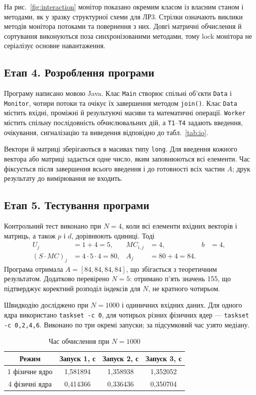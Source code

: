 \documentclass[12pt,a4paper]{article}
\begin{document}
На рис.~\ref{fig:interaction} монітор показано окремим класом із власним
станом і методами, як у зразку структурної схеми для ЛР3. Стрілки
означають виклики методів монітора потоками та повернення з них. Довгі
матричні обчислення й сортування виконуються поза синхронізованими
методами, тому lock монітора не серіалізує основне навантаження.

\subsection{Етап 4. Розроблення програми}
Програму написано мовою Java. Клас \texttt{Main} створює спільні об’єкти
\texttt{Data} і \texttt{Monitor}, чотири потоки та очікує їх завершення
методом \texttt{join()}. Клас \texttt{Data} містить вхідні, проміжні й
результуючі масиви та математичні операції. \texttt{Worker} містить
спільну послідовність обчислювальних дій, а \texttt{T1}--\texttt{T4}
задають введення, очікування, сигналізацію та виведення відповідно до
табл.~\ref{tab:io}.

Вектори й матриці зберігаються в масивах типу \texttt{long}. Для введення
кожного вектора або матриці задається одне число, яким заповнюються всі
елементи. Час фіксується після завершення всього введення і до готовності
всіх частин $A$; друк результату до вимірювання не входить.

\subsection{Етап 5. Тестування програми}
Контрольний тест виконано при $N=4$, коли всі елементи вхідних векторів і
матриць, а також $p$ і $d$, дорівнюють одиниці. Тоді
\begin{align*}
 U_j&=1+4=5, & MC_{i,j}&=4, & b&=4,\\
 (S\cdot MC)_j&=4\cdot5\cdot4=80, & A_j&=80+4=84.
\end{align*}
Програма отримала $A=[84,84,84,84]$, що збігається з теоретичним
результатом. Додатково перевірено $N=5$: отримано п’ять значень 155, що
підтверджує коректний розподіл індексів для $N$, не кратного чотирьом.

Швидкодію досліджено при $N=1000$ і одиничних вхідних даних. Для одного
ядра використано \texttt{taskset -c 0}, для чотирьох різних фізичних ядер
--- \texttt{taskset -c 0,2,4,6}. Виконано по три окремі запуски; за
підсумковий час узято медіану.

\begin{table}[H]
\centering\renewcommand{\arraystretch}{1.15}
\begin{tabular}{|c|c|c|c|}\hline
\textbf{Режим}&\textbf{Запуск 1, с}&\textbf{Запуск 2, с}&\textbf{Запуск 3, с}\\\hline
1 фізичне ядро&1,581894&1,358938&1,352052\\\hline
4 фізичні ядра&0,414366&0,336436&0,350704\\\hline
\end{tabular}
\caption{Час обчислення при $N=1000$}
\label{tab:time}
\end{table}
\end{document}
